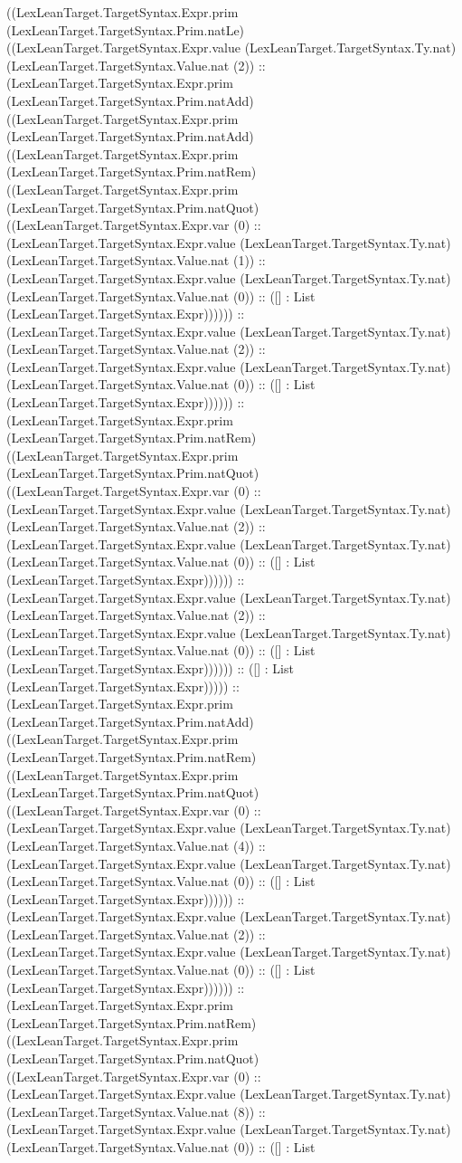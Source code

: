 \documentclass[11pt]{article}
\begin{document}
((LexLeanTarget.TargetSyntax.Expr.prim (LexLeanTarget.TargetSyntax.Prim.natLe) ((LexLeanTarget.TargetSyntax.Expr.value (LexLeanTarget.TargetSyntax.Ty.nat) (LexLeanTarget.TargetSyntax.Value.nat (2)) :: (LexLeanTarget.TargetSyntax.Expr.prim (LexLeanTarget.TargetSyntax.Prim.natAdd) ((LexLeanTarget.TargetSyntax.Expr.prim (LexLeanTarget.TargetSyntax.Prim.natAdd) ((LexLeanTarget.TargetSyntax.Expr.prim (LexLeanTarget.TargetSyntax.Prim.natRem) ((LexLeanTarget.TargetSyntax.Expr.prim (LexLeanTarget.TargetSyntax.Prim.natQuot) ((LexLeanTarget.TargetSyntax.Expr.var (0) :: (LexLeanTarget.TargetSyntax.Expr.value (LexLeanTarget.TargetSyntax.Ty.nat) (LexLeanTarget.TargetSyntax.Value.nat (1)) :: (LexLeanTarget.TargetSyntax.Expr.value (LexLeanTarget.TargetSyntax.Ty.nat) (LexLeanTarget.TargetSyntax.Value.nat (0)) :: ([] : List (LexLeanTarget.TargetSyntax.Expr)))))) :: (LexLeanTarget.TargetSyntax.Expr.value (LexLeanTarget.TargetSyntax.Ty.nat) (LexLeanTarget.TargetSyntax.Value.nat (2)) :: (LexLeanTarget.TargetSyntax.Expr.value (LexLeanTarget.TargetSyntax.Ty.nat) (LexLeanTarget.TargetSyntax.Value.nat (0)) :: ([] : List (LexLeanTarget.TargetSyntax.Expr)))))) :: (LexLeanTarget.TargetSyntax.Expr.prim (LexLeanTarget.TargetSyntax.Prim.natRem) ((LexLeanTarget.TargetSyntax.Expr.prim (LexLeanTarget.TargetSyntax.Prim.natQuot) ((LexLeanTarget.TargetSyntax.Expr.var (0) :: (LexLeanTarget.TargetSyntax.Expr.value (LexLeanTarget.TargetSyntax.Ty.nat) (LexLeanTarget.TargetSyntax.Value.nat (2)) :: (LexLeanTarget.TargetSyntax.Expr.value (LexLeanTarget.TargetSyntax.Ty.nat) (LexLeanTarget.TargetSyntax.Value.nat (0)) :: ([] : List (LexLeanTarget.TargetSyntax.Expr)))))) :: (LexLeanTarget.TargetSyntax.Expr.value (LexLeanTarget.TargetSyntax.Ty.nat) (LexLeanTarget.TargetSyntax.Value.nat (2)) :: (LexLeanTarget.TargetSyntax.Expr.value (LexLeanTarget.TargetSyntax.Ty.nat) (LexLeanTarget.TargetSyntax.Value.nat (0)) :: ([] : List (LexLeanTarget.TargetSyntax.Expr)))))) :: ([] : List (LexLeanTarget.TargetSyntax.Expr))))) :: (LexLeanTarget.TargetSyntax.Expr.prim (LexLeanTarget.TargetSyntax.Prim.natAdd) ((LexLeanTarget.TargetSyntax.Expr.prim (LexLeanTarget.TargetSyntax.Prim.natRem) ((LexLeanTarget.TargetSyntax.Expr.prim (LexLeanTarget.TargetSyntax.Prim.natQuot) ((LexLeanTarget.TargetSyntax.Expr.var (0) :: (LexLeanTarget.TargetSyntax.Expr.value (LexLeanTarget.TargetSyntax.Ty.nat) (LexLeanTarget.TargetSyntax.Value.nat (4)) :: (LexLeanTarget.TargetSyntax.Expr.value (LexLeanTarget.TargetSyntax.Ty.nat) (LexLeanTarget.TargetSyntax.Value.nat (0)) :: ([] : List (LexLeanTarget.TargetSyntax.Expr)))))) :: (LexLeanTarget.TargetSyntax.Expr.value (LexLeanTarget.TargetSyntax.Ty.nat) (LexLeanTarget.TargetSyntax.Value.nat (2)) :: (LexLeanTarget.TargetSyntax.Expr.value (LexLeanTarget.TargetSyntax.Ty.nat) (LexLeanTarget.TargetSyntax.Value.nat (0)) :: ([] : List (LexLeanTarget.TargetSyntax.Expr)))))) :: (LexLeanTarget.TargetSyntax.Expr.prim (LexLeanTarget.TargetSyntax.Prim.natRem) ((LexLeanTarget.TargetSyntax.Expr.prim (LexLeanTarget.TargetSyntax.Prim.natQuot) ((LexLeanTarget.TargetSyntax.Expr.var (0) :: (LexLeanTarget.TargetSyntax.Expr.value (LexLeanTarget.TargetSyntax.Ty.nat) (LexLeanTarget.TargetSyntax.Value.nat (8)) :: (LexLeanTarget.TargetSyntax.Expr.value (LexLeanTarget.TargetSyntax.Ty.nat) (LexLeanTarget.TargetSyntax.Value.nat (0)) :: ([] : List 
\end{document}
